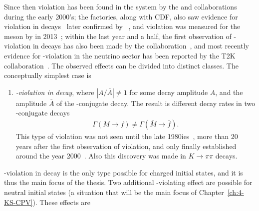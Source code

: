 Since then \CP violation has been found in the \Bz system by the \babar and \belle collaborations~\cite{babarcollaborationObservationMathitCPViolation2001,bellecollaborationObservationLargeMathitCP2001} during the early 2000's; the \B factories, along with CDF, also saw evidence for \CP violation in \Bpm decays~\cite{abeStudyCPCP2006,bellecollaborationEvidenceSuppressedDecay2011,thebabarcollaborationMeasurementCPObservables2010,thebabarcollaborationSearchEnsuremathRightarrowu2010,cdfcollaborationMeasurementsBranchingFraction2010,cdfcollaborationMeasurementsBranchingFraction2011} later confirmed by \lhcb~\cite{LHCb-PAPER-2012-001}, and \CP violation was measured for the \Bs meson by \lhcb in 2013~\cite{LHCb-PAPER-2013-018}; within the last year and a half, the first observation of \CP-violation in \Dz decays has also been made by the \lhcb collaboration~\cite{LHCb-PAPER-2019-006}, and most recently evidence for \CP-violation in the neutrino sector has been reported by the T2K collaboration~\cite{abeConstraintMatterAntimatter2020}. The observed effects can be divided into distinct classes. The conceptually simplest case is
\begin{enumerate}
    \item \emph{\CP-violation in decay}, where $|A / \bar A| \neq 1$ for some decay amplitude $A$, and the amplitude $\bar A$ of the \CP-conjugate decay. The result is different decay rates in two \CP-conjugate decays
    \begin{align}
        \Gamma (M\to f) \neq \Gamma (\bar M \to \bar f).
    \end{align}
    This type of \CP violation was not seen until the late 1980ies~\cite{gibbonsMeasurementCPviolationParameter1993,barrNewMeasurementDirect1993}, more than 20 years after the first observation of \CP violation, and only finally established around the year 2000~\cite{batleyPrecisionMeasurementDirect2002,ktevcollaborationMeasurementsDirectMathrmCP2003}. Also this discovery was made in $K\to\pi\pi$ decays. 
\end{enumerate}
\CP-violation in decay is the only type possible for charged initial states, and it is thus the main focus of the thesis. Two additional \CP-violating effect are possible for neutral initial states (a situation that will be the main focus of Chapter~\ref{ch:4-KS-CPV}). These effects are
